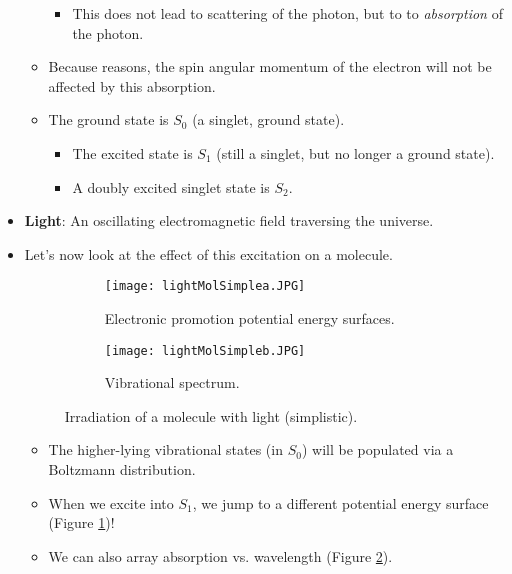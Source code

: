 \documentclass[../notes.tex]{subfiles}
\begin{document}
\begin{itemize}
\begin{itemize}
        \begin{itemize}
            \item This does not lead to scattering of the photon, but to to \emph{absorption} of the photon.
        \end{itemize}
        \item Because reasons, the spin angular momentum of the electron will not be affected by this absorption.
        \item The ground state is $S_0$ (a singlet, ground state).
        \begin{itemize}
            \item The excited state is $S_1$ (still a singlet, but no longer a ground state).
            \item A doubly excited singlet state is $S_2$.
        \end{itemize}
    \end{itemize}
    \item \textbf{Light}: An oscillating electromagnetic field traversing the universe.
    \item Let's now look at the effect of this excitation on a molecule.
    \begin{figure}[h!]
        \centering
        \begin{subfigure}[b]{0.49\linewidth}
            \centering
            \texttt{[image: lightMolSimplea.JPG]}
            \caption{Electronic promotion potential energy surfaces.}
            \label{fig:lightMolSimplea}
        \end{subfigure}
        \begin{subfigure}[b]{0.35\linewidth}
            \centering
            \texttt{[image: lightMolSimpleb.JPG]}
            \caption{Vibrational spectrum.}
            \label{fig:lightMolSimpleb}
        \end{subfigure}
        \caption{Irradiation of a molecule with light (simplistic).}
        \label{fig:lightMolSimple}
    \end{figure}
    \begin{itemize}
        \item The higher-lying vibrational states (in $S_0$) will be populated via a Boltzmann distribution.
        \item When we excite into $S_1$, we jump to a different potential energy surface (Figure \ref{fig:lightMolSimplea})!
        \item We can also array absorption vs. wavelength (Figure \ref{fig:lightMolSimpleb}).

\end{itemize}
\end{itemize}
\end{document}
